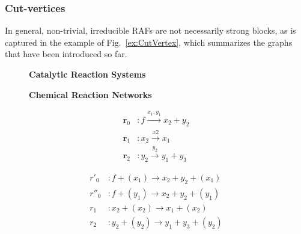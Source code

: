 \documentclass[pdflatex]{sn-jnl}
\theoremstyle{thmstyleone}%
\theoremstyle{examplesty}%
\theoremstyle{thmstylethree}%
\newcommand{\fr}[0]{\mathbf{r}}
\begin{document}
\subsubsection{Cut-vertices}

In general, non-trivial, irreducible RAFs are not necessarily strong
blocks, as is captured in the example of Fig.~\ref{ex:CutVertex}, which
summarizes the graphs that have been introduced so far.
\begin{figure}[htb]
  \centering
  \begin{minipage}[c]{0.49\textwidth}
    \centering	
    \textbf{Catalytic Reaction Systems}
  \end{minipage}%
  \hfill%
  \begin{minipage}[c]{0.49\textwidth}	
    \centering
    \textbf{Chemical Reaction Networks}
  \end{minipage}
  \begin{minipage}[c]{0.49\textwidth}	
    \centering
    \begin{equation}
      \begin{split}
	\fr_0&: f  \xrightarrow{x_1,y_1} x_2 + y_2 \\
	\fr_1&: x_2 \xrightarrow{x2} x_1 \\
	\fr_2&: y_2   \xrightarrow{y_2} y_1 + y_3
      \end{split}
    \end{equation}
  \end{minipage}%
  \hfill%
  \begin{minipage}[c]{0.49\textwidth}
    \centering
    \begin{equation}
      \begin{split}
	r'_0&: f + (x_1) \longrightarrow x_2 + y_2 +(x_1)\\
	r''_0&: f + (y_1) \longrightarrow x_2 + y_2 +(y_1)\\
	r_1&: x_2 + (x_2)\longrightarrow x_1 + (x_2) \\
	r_2&: y_2 + (y_2) \longrightarrow y_1 + y_3 + (y_2)
      \end{split}
    \end{equation}
  \end{minipage}
  \par\bigskip	
  \begin{minipage}[c]{0.49\textwidth}
    \centering
\end{minipage}
\end{figure}
\end{document}
